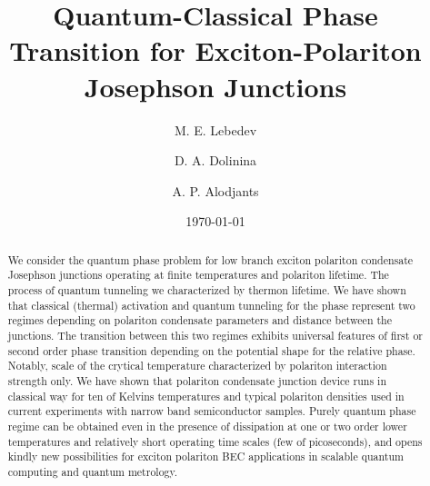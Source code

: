 \documentclass[aps, pre, preprint, groupedaddress, superscriptaddress, showkeys, showpacs] {revtex4-1}
\begin{document}
\title{Quantum-Classical Phase Transition for Exciton-Polariton Josephson Junctions}

\author{M. E. Lebedev}

\author{D. A. Dolinina}


\author{A. P. Alodjants}

\date{\today}

\begin{abstract}
We consider the quantum phase problem for low branch exciton polariton condensate Josephson junctions operating at finite temperatures and polariton lifetime. The process of quantum tunneling we characterized by thermon lifetime. We have shown that classical (thermal) activation and quantum tunneling for the phase  represent two regimes depending on polariton condensate parameters and distance between the junctions. The transition between this two regimes   exhibits universal features of first or second order phase transition depending on the potential shape for the relative phase. Notably, scale of the crytical temperature  characterized by polariton interaction strength only. We have shown that polariton condensate junction device runs in classical way for ten of Kelvins temperatures and typical polariton densities used in current experiments with narrow band semiconductor samples. Purely  quantum phase regime can be obtained even in the presence of dissipation at one or two order lower temperatures and relatively short operating time scales (few of picoseconds), and   opens kindly new possibilities for exciton polariton BEC applications in scalable quantum computing and quantum metrology.   
\end{abstract}

\pacs{\dots}
\keywords{\dots}

\maketitle

\newcommand{\sn}{\textrm{sn}}
\newcommand{\cn}{\textrm{cn}}
\newcommand{\dn}{\textrm{dn}}
\newcommand{\sd}{\textrm{sd}}
\newcommand{\cd}{\textrm{cd}}
\newcommand{\nd}{\textrm{nd}}
\newcommand{\am}{\textrm{am}}

\newcommand{\red}{\color{red}}
\end{document}
